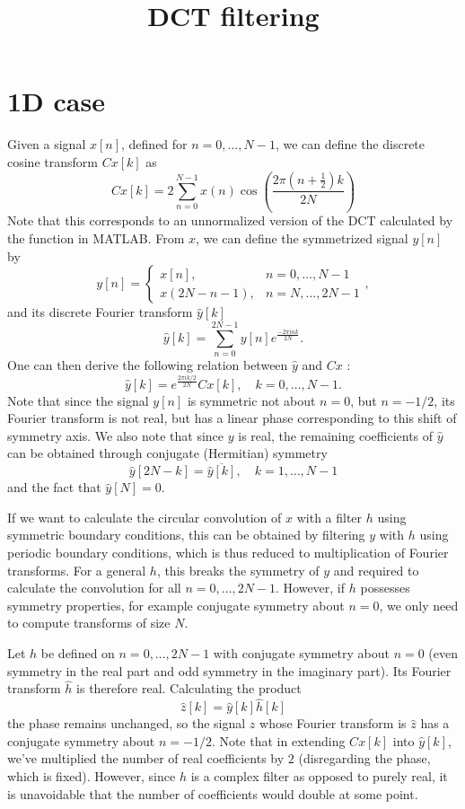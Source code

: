 \documentclass[twocolumn]{article}
\title{DCT filtering}
\begin{document}
	
\maketitle

\section{1D case}

Given a signal $x[n]$, defined for $n = 0,\ldots,N-1$, we can define the discrete cosine transform $Cx[k]$ as
\[
Cx[k] = 2\sum_{n=0}^{N-1}x(n)\cos\left(\frac{2\pi\left(n+\frac{1}{2}\right)k}{2N}\right)
\]
Note that this corresponds to an unnormalized version of the DCT calculated by  the  function in MATLAB. From $x$, we can define the symmetrized signal $y[n]$ by
\[
y[n] = \left\{\begin{array}{ll} x[n], & n=0,\ldots,N-1 \\ x(2N-n-1), & n = N,\ldots,2N-1\end{array}\right.,
\]
and its discrete Fourier transform $\hat{y}[k]$
\[
\hat{y}[k] = \sum_{n=0}^{2N-1}y[n]e^{\frac{-2\pi i n k}{2N}}.
\]
One can then derive the following relation between $\hat{y}$ and $Cx$ \cite{makhoul}:
\[
\hat{y}[k] = e^{\frac{2\pi i k/2}{2N}}Cx[k],\quad k=0,\ldots,N-1.
\]
Note that since the signal $y[n]$ is symmetric not about $n=0$, but $n=-1/2$, its Fourier transform is not real, but has a linear phase corresponding to this shift of symmetry axis. We also note that since $y$ is real, the remaining coefficients of $\hat{y}$ can be obtained through conjugate (Hermitian) symmetry
\[
\hat{y}[2N-k] = \overline{\hat{y}[k]},\quad k=1,\ldots,N-1
\]
and the fact that $\hat{y}[N] = 0$.

If we want to calculate the circular convolution of $x$ with a filter $h$ using symmetric boundary conditions, this can be obtained by filtering $y$ with $h$ using periodic boundary conditions, which is thus reduced to multiplication of Fourier transforms. For a general $h$, this breaks the symmetry of $y$ and required to calculate the convolution for all $n=0,\ldots,2N-1$. However, if $h$ possesses symmetry properties, for example conjugate symmetry about $n = 0$, we only need to compute transforms of size $N$.

Let $h$ be defined on $n=0,\ldots,2N-1$ with conjugate symmetry about $n=0$ (even symmetry in the real part and odd symmetry in the imaginary part). Its Fourier transform $\hat{h}$ is therefore real. Calculating the product
\[
\hat{z}[k] = \hat{y}[k]\hat{h}[k]
\]
the phase remains unchanged, so the signal $z$ whose Fourier transform is $\hat{z}$ has a conjugate symmetry about $n=-1/2$. Note that in extending $Cx[k]$ into $\hat{y}[k]$, we've multiplied the number of real coefficients by $2$ (disregarding the phase, which is fixed). However, since $h$ is a complex filter as opposed to purely real, it is unavoidable that the number of coefficients would double at some point.
\end{document}

